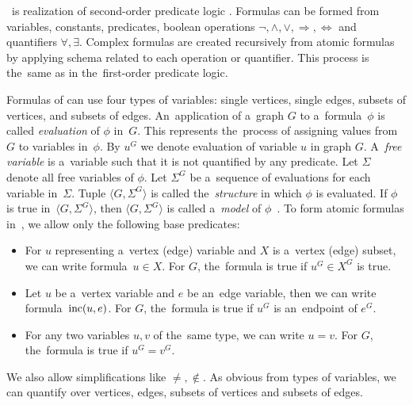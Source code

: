 \MSO{}~is realization of second-order predicate logic%
.
Formulas can be formed from
variables, constants, predicates,
boolean operations \( \lnot, \land, \lor, \Rightarrow, \Leftrightarrow \)
and quantifiers \( \forall, \exists \).
Complex formulas are created recursively from atomic formulas
by applying schema related to each operation or quantifier.
This process is the~same as in the~first-order predicate logic.

Formulas of \MSO{} can use four types of variables:
single vertices, single edges, subsets of vertices, and subsets of edges.
%
An~application of a~graph \( G \) to a~formula~\( \phi \) is called \emph{evaluation}
of \( \phi \) in~\( G \).
This represents the~process of assigning values from \( G \) to variables in~\( \phi \).
%
By \( u^G \) we denote evaluation of variable \( u \) in graph \( G \).
%
A~\emph{free variable} is a~variable such that it is not quantified by any predicate.
Let \( \Sigma \) denote all free variables of \( \phi \).
%
Let \( \Sigma^G \) be a~sequence of evaluations for each variable in~\( \Sigma \).
Tuple \( \langle G, \Sigma^G \rangle \) is called the~\emph{structure}
in which \( \phi \) is evaluated.
If \( \phi \) is true in~\( \langle G, \Sigma^G \rangle \),
then \( \langle G, \Sigma^G \rangle \)
is called a~\emph{model} of \( \phi \)~\cite{book_parametrized_algorithms}.
%
To form atomic formulas in~\MSO{}, we allow only the following base predicates:
%
\begin{itemize}
	\item For \( u \) representing a~vertex (edge) variable
	      and \( X \) is a~vertex (edge) subset,
	      we can write formula~\( u \in X \).
	      For \( G \), the~formula is true if \( u^G \in X^G \) is true.
	\item Let \( u \) be a~vertex variable and \( e \) be an~edge variable,
	      then we can write formula~\( \text{inc} (u, e) \).
	      For \( G \), the~formula is true if \( u^G \) is an~endpoint of \( e^G \).
	\item For any two variables \( u, v \) of the~same type, we can write \( u = v \).
	      For \( G \), the~formula is true if \( u^G = v^G \).
\end{itemize}
%
We also allow simplifications like \( \ne, \not\in \).
As obvious from types of variables, we can quantify over vertices, edges,
subsets of vertices and subsets of edges.

